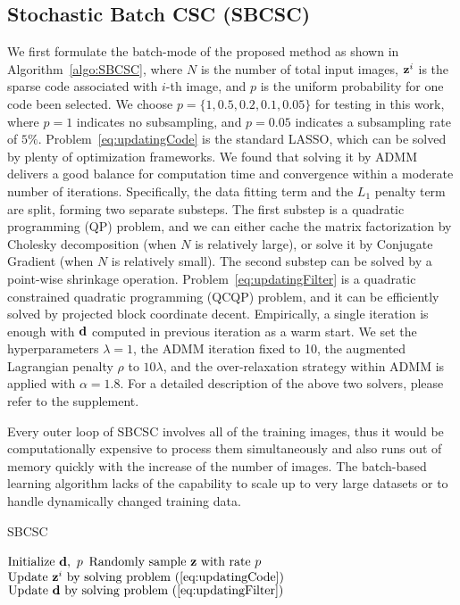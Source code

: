 \subsection{Stochastic Batch CSC (SBCSC)}
We first formulate the batch-mode of the proposed method as shown in Algorithm~\ref{algo:SBCSC}, where $N$ is the number of total input images, $\code^i$ is the sparse code associated with $i$-th image, and $p$ is the uniform probability for one code been selected. We choose $p=\{1, 0.5, 0.2, 0.1, 0.05\}$ for testing in this work, where $p=1$ indicates no subsampling, and $p=0.05$ indicates a subsampling rate of $5\%$. Problem~\ref{eq:updatingCode} is the standard LASSO, which can be solved by plenty of optimization frameworks. We found that solving it by ADMM delivers a good balance for computation time and convergence within a moderate number of iterations. Specifically, the data fitting term and the $L_1$ penalty term are split, forming two separate substeps. The first substep is a quadratic programming (QP) problem, and we can either cache the matrix factorization by Cholesky decomposition (when $N$ is relatively large), or solve it by Conjugate Gradient (when $N$ is relatively small). The second substep can be solved by a point-wise shrinkage operation. Problem~\ref{eq:updatingFilter} is a quadratic constrained quadratic programming (QCQP) problem, and it can be efficiently solved by projected block coordinate decent. Empirically, a single iteration is enough with $\filter$ computed in previous iteration as a warm start. We set the hyperparameters $\lambda=1$, the ADMM iteration fixed to 10, the augmented Lagrangian penalty $\rho$ to $10 \lambda$, and the over-relaxation strategy within ADMM is applied with $\alpha = 1.8$. For a detailed description of the above two solvers, please refer to the supplement.

Every outer loop of SBCSC involves all of the training images, thus it would be computationally expensive to process them simultaneously and also runs out of memory quickly with the increase of the number of images. The batch-based learning algorithm lacks of the capability to scale up to very large datasets or to handle dynamically changed training data.

\begin{algorithm}[H]
\caption{SBCSC} \label{algo:SBCSC}
\begin{algorithmic}[1]
\State $\text{Initialize } \filter, ~p$
    \State $ \text{Randomly sample }\code \text{ with rate } p $
        \State $ \text{Update } \code^i \text{ by solving problem~(\ref{eq:updatingCode}})$
    \EndFor
    \State $\text{Update } \filter \text{ by solving problem~(\ref{eq:updatingFilter}})$
\EndWhile
\end{algorithmic}
\end{algorithm}

